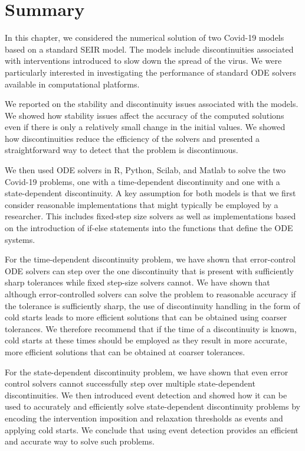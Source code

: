 \section{Summary}
\label{section:summary}
In this chapter, we considered the numerical solution of two Covid-19 models based on a standard SEIR model. The models include discontinuities associated with interventions introduced to slow down the spread of the virus. We were particularly interested in investigating the performance of standard ODE solvers available in computational platforms.

We reported on the stability and discontinuity issues associated with the models. We showed how stability issues affect the accuracy of the computed solutions even if there is only a relatively small change in the initial values. We showed how discontinuities reduce the efficiency of the solvers and presented a straightforward way to detect that the problem is discontinuous.

We then used ODE solvers in R, Python, Scilab, and Matlab to solve the two Covid-19 problems, one with a time-dependent discontinuity and one with a state-dependent discontinuity. A key assumption for both models is that we first consider reasonable implementations that might typically be employed by a researcher. This includes fixed-step size solvers as well as implementations based on the introduction of if-else statements into the functions that define the ODE systems. 

For the time-dependent discontinuity problem, we have shown that error-control ODE solvers can step over the one discontinuity that is present with sufficiently sharp tolerances while fixed step-size solvers cannot. We have shown that although error-controlled solvers can solve the problem to reasonable accuracy if the tolerance is sufficiently sharp, the use of discontinuity handling in the form of cold starts leads to more efficient solutions that can be obtained using coarser tolerances. We therefore recommend that if the time of a discontinuity is known, cold starts at these times should be employed as they result in more accurate, more efficient solutions that can be obtained at coarser tolerances.

For the state-dependent discontinuity problem, we have shown that even error control solvers cannot successfully step over multiple state-dependent discontinuities. We then introduced event detection and showed how it can be used to accurately and efficiently solve state-dependent discontinuity problems by encoding the intervention imposition and relaxation thresholds as events and applying cold starts. We conclude that using event detection provides an efficient and accurate way to solve such problems.

